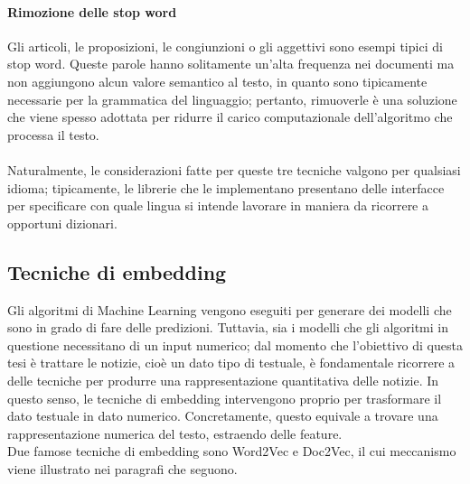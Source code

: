 \documentclass[12pt]{report}
\theoremstyle{definition}
\begin{document}
\paragraph{Rimozione delle stop word}
Gli articoli, le proposizioni, le congiunzioni o gli aggettivi sono esempi tipici di stop word. Queste parole hanno solitamente un'alta frequenza nei documenti ma non aggiungono alcun valore semantico al testo, in quanto sono tipicamente necessarie per la grammatica del linguaggio; pertanto, rimuoverle è una soluzione che viene spesso adottata per ridurre il carico computazionale dell'algoritmo che processa il testo.
\\
\\
Naturalmente, le considerazioni fatte per queste tre tecniche valgono per qualsiasi idioma; tipicamente, le librerie che le implementano presentano delle interfacce per specificare con quale lingua si intende lavorare in maniera da ricorrere a opportuni dizionari.

\subsection{Tecniche di embedding} \label{embedding}
Gli algoritmi di Machine Learning vengono eseguiti per generare dei modelli che sono in grado di fare delle predizioni. Tuttavia, sia i modelli che gli algoritmi in questione necessitano di un input numerico; dal momento che l'obiettivo di questa tesi è trattare le notizie, cioè un dato tipo di testuale, è fondamentale ricorrere a delle tecniche per produrre una rappresentazione quantitativa delle notizie.
In questo senso, le tecniche di embedding intervengono proprio per trasformare il dato testuale in dato numerico.
Concretamente, questo equivale a trovare una rappresentazione numerica del testo, estraendo delle feature.
\\
Due famose tecniche di embedding sono Word2Vec e Doc2Vec, il cui meccanismo viene illustrato nei paragrafi che seguono.
\end{document}
